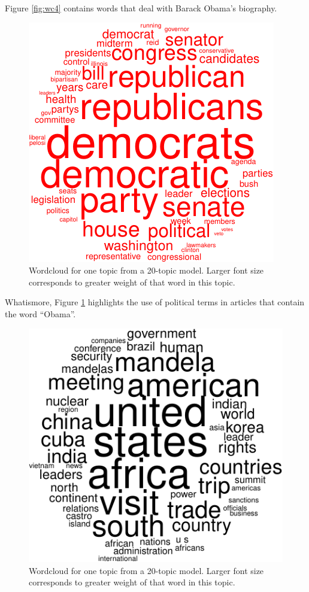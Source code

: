 \documentclass[12pt,]{article}
\begin{document}
Figure \ref{fig:wc4} contains words that deal with Barack Obama's
biography.

\begin{figure}
\includegraphics[width=\textwidth]{2016-03-17-obama_files/figure-latex/wordcloud-5.pdf}
\caption{Wordcloud for one topic from a 20-topic model. Larger font size corresponds to greater weight of that word in this topic.\label{fig:wc5}}
\end{figure}

Whatismore, Figure \ref{fig:wc5} highlights the use of political terms
in articles that contain the word ``Obama''.

\begin{figure}
\includegraphics[width=\textwidth]{2016-03-17-obama_files/figure-latex/wordcloud-8.pdf}
\caption{Wordcloud for one topic from a 20-topic model. Larger font size corresponds to greater weight of that word in this topic.\label{fig:wc8}}
\end{figure}
\end{document}
